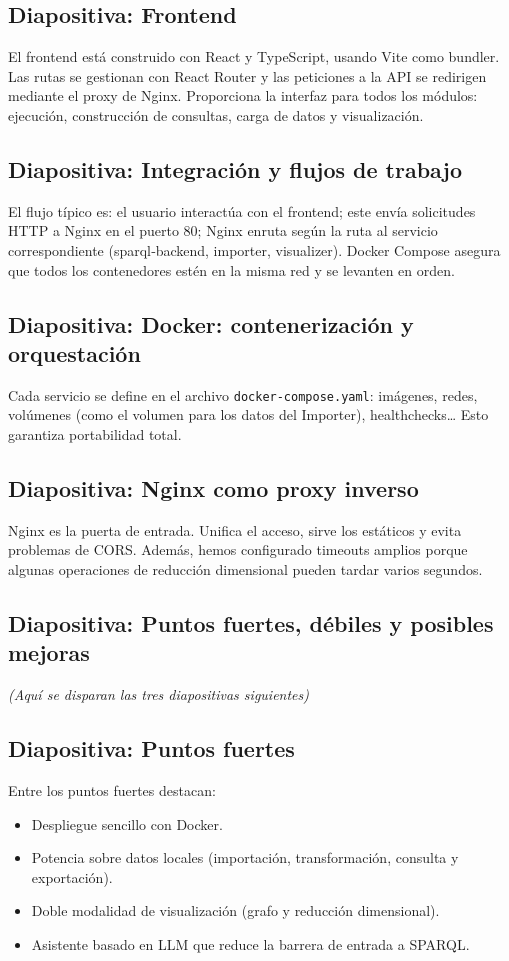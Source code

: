 \documentclass{article}
\begin{document}
\subsection*{Diapositiva: Frontend}
El frontend está construido con React y TypeScript, usando Vite como bundler. Las rutas se gestionan con React Router y las peticiones a la API se redirigen mediante el proxy de Nginx. Proporciona la interfaz para todos los módulos: ejecución, construcción de consultas, carga de datos y visualización.

\subsection*{Diapositiva: Integración y flujos de trabajo}
El flujo típico es: el usuario interactúa con el frontend; este envía solicitudes HTTP a Nginx en el puerto 80; Nginx enruta según la ruta al servicio correspondiente (sparql‑backend, importer, visualizer). Docker Compose asegura que todos los contenedores estén en la misma red y se levanten en orden.

\subsection*{Diapositiva: Docker: contenerización y orquestación}
Cada servicio se define en el archivo \texttt{docker-compose.yaml}: imágenes, redes, volúmenes (como el volumen para los datos del Importer), healthchecks… Esto garantiza portabilidad total.

\subsection*{Diapositiva: Nginx como proxy inverso}
Nginx es la puerta de entrada. Unifica el acceso, sirve los estáticos y evita problemas de CORS. Además, hemos configurado timeouts amplios porque algunas operaciones de reducción dimensional pueden tardar varios segundos.

\subsection*{Diapositiva: Puntos fuertes, débiles y posibles mejoras}
\textit{(Aquí se disparan las tres diapositivas siguientes)}

\subsection*{Diapositiva: Puntos fuertes}
Entre los puntos fuertes destacan:
\begin{itemize}
    \item Despliegue sencillo con Docker.
    \item Potencia sobre datos locales (importación, transformación, consulta y exportación).
    \item Doble modalidad de visualización (grafo y reducción dimensional).
    \item Asistente basado en LLM que reduce la barrera de entrada a SPARQL.
\end{itemize}
\end{document}
